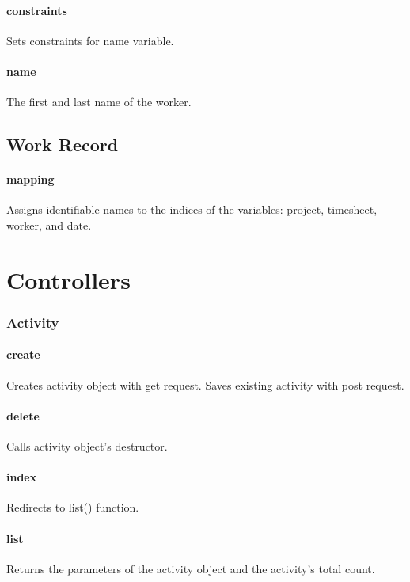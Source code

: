 \documentclass[12pt]{article}
\begin{document}
\paragraph{constraints} Sets constraints for name variable.
\paragraph{name} The first and last name of the worker.

\setcounter{paragraph}{0}
\subsection{Work Record}\label{sec:DWork Record}
\paragraph{mapping} Assigns identifiable names to the indices of the variables: project, timesheet, worker, and date.

\section{Controllers}\label{sec:Controllers}

\subsubsection{Activity}\label{sec:CActivity}
\paragraph{create} Creates activity object with get request. Saves existing activity with post request.
\paragraph{delete} Calls activity object's destructor.
\paragraph{index} Redirects to list() function.
\paragraph{list} Returns the parameters of the activity object and the activity's total count.
\end{document}
